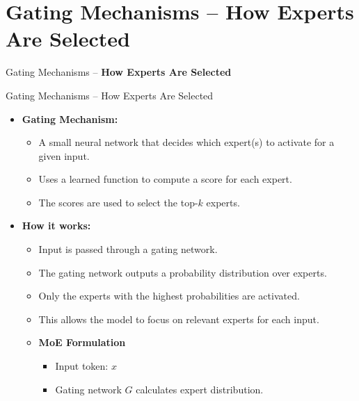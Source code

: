 \section{Gating Mechanisms – How Experts Are Selected}
\begin{frame}[allowframebreaks]{}
    \LARGE Gating Mechanisms – \textbf{How Experts Are Selected}
\end{frame}

\begin{frame}[allowframebreaks]{Gating Mechanisms – How Experts Are Selected}
    \begin{itemize}
        \item \textbf{Gating Mechanism:}
        \begin{itemize}
            \item A small neural network that decides which expert(s) to activate for a given input.
            \item Uses a learned function to compute a score for each expert.
            \item The scores are used to select the top-$k$ experts.
        \end{itemize}
    \framebreak
        \item \textbf{How it works:}
        \begin{itemize}
            \item Input is passed through a gating network.
            \item The gating network outputs a probability distribution over experts.
            \item Only the experts with the highest probabilities are activated.
            \item This allows the model to focus on relevant experts for each input.
        \end{itemize}
    \framebreak
        \begin{itemize}
            \item \textbf{MoE Formulation}
            \begin{itemize}
                \item Input token: $x$
                \item Gating network $G$ calculates expert distribution.
            \end{itemize}


\end{itemize}
\end{itemize}
\end{frame}
